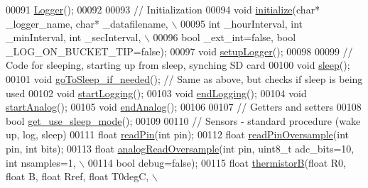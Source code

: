 \begin{DoxyCode}
00091     \hyperlink{classLogger_abc41bfb031d896170c7675fa96a6b30c}{Logger}();
00092     
00093     \textcolor{comment}{// Initialization}
00094     \textcolor{keywordtype}{void} \hyperlink{classLogger_a635c5dc0046646bec7023ef7133f0eb3}{initialize}(\textcolor{keywordtype}{char}* \_logger\_name, \textcolor{keywordtype}{char}* \_datafilename, \(\backslash\)
00095          \textcolor{keywordtype}{int} \_hourInterval, \textcolor{keywordtype}{int} \_minInterval, \textcolor{keywordtype}{int} \_secInterval, \(\backslash\)
00096          \textcolor{keywordtype}{bool} \_ext\_int=\textcolor{keyword}{false}, \textcolor{keywordtype}{bool} \_LOG\_ON\_BUCKET\_TIP=\textcolor{keyword}{false});
00097     \textcolor{keywordtype}{void} \hyperlink{classLogger_ab5e0bd543758c65a17b77553a0e9f0c9}{setupLogger}();
00098     
00099     \textcolor{comment}{// Code for sleeping, starting up from sleep, synching SD card}
00100     \textcolor{keywordtype}{void} \hyperlink{classLogger_ad90ff8f29410f6b70cc6334391400a4e}{sleep}();
00101     \textcolor{keywordtype}{void} \hyperlink{classLogger_ad28cf6450ada04f0e1475998bede5b88}{goToSleep\_if\_needed}(); \textcolor{comment}{// Same as above, but checks if sleep is being used}
00102     \textcolor{keywordtype}{void} \hyperlink{classLogger_a4a6c78dd1715b33ae4bbd6f66f116f77}{startLogging}();
00103     \textcolor{keywordtype}{void} \hyperlink{classLogger_aa82814d61687debcf3b8dd6f46c9d549}{endLogging}();
00104     \textcolor{keywordtype}{void} \hyperlink{classLogger_af936c7f58e23316abb5614cbd31c7ced}{startAnalog}();
00105     \textcolor{keywordtype}{void} \hyperlink{classLogger_adca7be8a63592263c67f63766680d16f}{endAnalog}();
00106     
00107     \textcolor{comment}{// Getters and setters}
00108     \textcolor{keywordtype}{bool} \hyperlink{classLogger_acc758b6fdaac8099c492929aa7f1691d}{get\_use\_sleep\_mode}();
00109     
00110     \textcolor{comment}{// Sensors - standard procedure (wake up, log, sleep)}
00111     \textcolor{keywordtype}{float} \hyperlink{classLogger_a343fcabefb37e06429865a2e6a6e708a}{readPin}(\textcolor{keywordtype}{int} pin);
00112     \textcolor{keywordtype}{float} \hyperlink{classLogger_a4e67526c65fa865f276a515a200af4aa}{readPinOversample}(\textcolor{keywordtype}{int} pin, \textcolor{keywordtype}{int} bits);
00113     \textcolor{keywordtype}{float} \hyperlink{classLogger_ad8296890a14a0df83c2433a20f25b899}{analogReadOversample}(\textcolor{keywordtype}{int} pin, uint8\_t adc\_bits=10, \textcolor{keywordtype}{int} nsamples=1, \(\backslash\)
00114           \textcolor{keywordtype}{bool} debug=\textcolor{keyword}{false});
00115     \textcolor{keywordtype}{float} \hyperlink{classLogger_a55d923b98a6c503fccb25bfd4af32f3d}{thermistorB}(\textcolor{keywordtype}{float} R0, \textcolor{keywordtype}{float} B, \textcolor{keywordtype}{float} Rref, \textcolor{keywordtype}{float} T0degC, \(\backslash\)

\end{DoxyCode}
